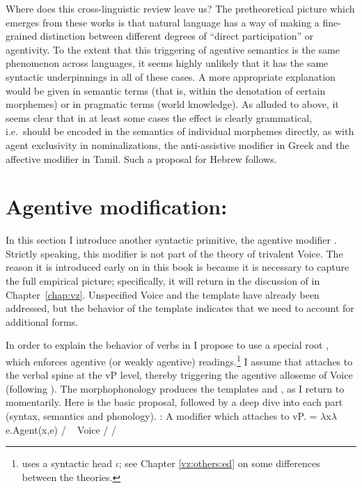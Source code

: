 {Where does this cross-linguistic review leave us? The pretheoretical picture which emerges from these works is that natural language has a way of making a fine-grained distinction between different degrees of ``direct participation'' or agentivity. To the extent that this triggering of agentive semantics is the same phenomenon across languages, it seems highly unlikely that it has the same syntactic underpinnings in all of these cases. A more appropriate explanation would be given in semantic terms (that is, within the denotation of certain morphemes) or in pragmatic terms (world knowledge). As alluded to above, it seems clear that in at least some cases the effect is clearly grammatical, i.e.~should be encoded in the semantics of individual morphemes directly, as with agent exclusivity in nominalizations, the anti-assistive modifier in Greek and the affective modifier in Tamil. Such a proposal for Hebrew follows.

\section{Agentive modification: \va} \label{voice:va}
In this section I introduce another syntactic primitive, the agentive modifier {\va}. Strictly speaking, this modifier is not part of the theory of trivalent Voice. The reason it is introduced early on in this book is because it is necessary to capture the full empirical picture; specifically, it will return in the discussion of {\vz} in Chapter~\ref{chap:vz}. Unspecified Voice and the template {\tkal} have already been addressed, but the behavior of the template {\tpie} indicates that we need to account for additional forms.

In order to explain the behavior of verbs in {\tpie} I propose to use a special root {\va}, which enforces agentive (or weakly agentive) readings.\footnote{\cite{doron03} uses a syntactic head $\iota$; see Chapter \ref{vz:others:ed} on some differences between the theories.} I assume that {\va} attaches to the verbal spine at the vP level, thereby triggering the agentive alloseme of Voice (following \citealt{doron03,doron14adj}). The morphophonology produces the templates {\tpie} and {\thit}, as I return to momentarily. Here is the basic proposal, followed by a deep dive into each part (syntax, semantics and phonology).
\pex {\va}:
	\a A modifier which attaches to vP.
	\a {} = $\lambda$x$\lambda$e.Agent(x,e) / \trace~\va
	\a Voice {\lra} {\tpie} / {\trace} {\va}
	\a {\vz} {\lra} {\thit} / {\trace} {\va}
\xe

}
